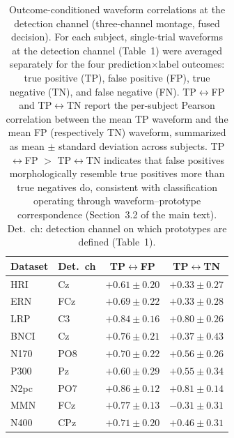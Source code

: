\begin{table}[t]
\centering
\setlength{\tabcolsep}{6pt}
\caption{%
Outcome-conditioned waveform correlations at the detection channel (three-channel montage, fused decision). For each subject, single-trial waveforms at the detection channel (Table~1) were averaged separately for the four prediction$\times$label outcomes: true positive (TP), false positive (FP), true negative (TN), and false negative (FN). TP$\leftrightarrow$FP and TP$\leftrightarrow$TN report the per-subject Pearson correlation between the mean TP waveform and the mean FP (respectively TN) waveform, summarized as mean $\pm$ standard deviation across subjects. TP$\leftrightarrow$FP $>$ TP$\leftrightarrow$TN indicates that false positives morphologically resemble true positives more than true negatives do, consistent with classification operating through waveform--prototype correspondence (Section~3.2 of the main text). Det.\ ch: detection channel on which prototypes are defined (Table~1).%
}
\label{sup:tab-corr}
\begin{tabular}{llcc}
\toprule
Dataset & Det.\ ch & TP$\leftrightarrow$FP & TP$\leftrightarrow$TN \\
\midrule
HRI & Cz & $+0.61 \pm 0.20$ & $+0.33 \pm 0.27$ \\
ERN & FCz & $+0.69 \pm 0.22$ & $+0.33 \pm 0.28$ \\
LRP & C3 & $+0.84 \pm 0.16$ & $+0.80 \pm 0.26$ \\
BNCI & Cz & $+0.76 \pm 0.21$ & $+0.37 \pm 0.43$ \\
N170 & PO8 & $+0.70 \pm 0.22$ & $+0.56 \pm 0.26$ \\
P300 & Pz & $+0.60 \pm 0.29$ & $+0.55 \pm 0.34$ \\
N2pc & PO7 & $+0.86 \pm 0.12$ & $+0.81 \pm 0.14$ \\
MMN & FCz & $+0.77 \pm 0.13$ & $-0.31 \pm 0.31$ \\
N400 & CPz & $+0.71 \pm 0.20$ & $+0.46 \pm 0.31$ \\
\bottomrule
\end{tabular}
\end{table}
